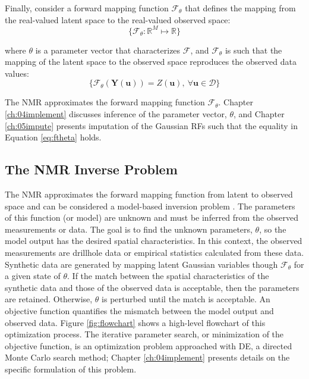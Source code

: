 Finally, consider a forward mapping function $\mathcal{F}_{\theta}$ that defines the mapping from the real-valued latent space to the real-valued observed space:
\begin{equation}
    \{\mathcal{F}_{\theta}: \mathbb{R}^{M} \mapsto \mathbb{R} \}
    \label{eq:fmap}
\end{equation}

\lowercase{Where} $\theta$ is a parameter vector that characterizes $\mathcal{F}$, and $\mathcal{F}_{\theta}$ is such that the mapping of the latent space to the observed space reproduces the observed data values:
\begin{equation}
    \{\mathcal{F}_{\theta}(\mathbf{Y}(\mathbf{u})) = Z(\mathbf{u}), \ \forall \mathbf{u} \in \mathcal{D}\}
    \label{eq:ftheta}
\end{equation}

The \gls{NMR} approximates the forward mapping function $\mathcal{F}_{\theta}$. Chapter \ref{ch:04implement} discusses inference of the parameter vector, $\theta$, and Chapter \ref{ch:05impute} presents imputation of the Gaussian \glspl{RF} such that the equality in Equation \ref{eq:ftheta} holds.

\subsection{The NMR Inverse Problem}
\label{subsec:03nmrinverse}

The \gls{NMR} approximates the forward mapping function from latent to observed space and can be considered a model-based inversion problem \citep{sen2013global}. The parameters of this function (or model) are unknown and must be inferred from the observed measurements or data. The goal is to find the unknown parameters, $\theta$, so the model output has the desired spatial characteristics. In this context, the observed measurements are drillhole data or empirical statistics calculated from these data. Synthetic data are generated by mapping latent Gaussian variables though $\mathcal{F}_{\theta}$ for a given state of $\theta$. If the match between the spatial characteristics of the synthetic data and those of the observed data is acceptable, then the parameters are retained. Otherwise, $\theta$ is perturbed until the match is acceptable. An objective function quantifies the mismatch between the model output and observed data. Figure \ref{fig:flowchart} shows a high-level flowchart of this optimization process. The iterative parameter search, or minimization of the objective function, is an optimization problem approached with \gls{DE}, a directed Monte Carlo search method; Chapter \ref{ch:04implement} presents details on the specific formulation of this problem.


